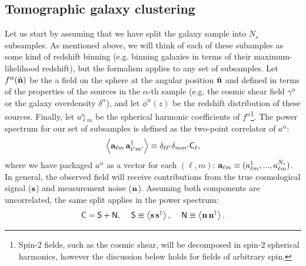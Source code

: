 \documentclass[twocolumn,amsfont,amssymb,amsmath, showpacs,balancelastpage, nofootinbib]{revtex4-1}
\newcommand{\nv}{\hat{\bf n}}
\begin{document}
  \subsection{Tomographic galaxy clustering}\label{ssec:method.tomographic}
    Let us start by assuming that we have split the galaxy sample into $N_s$ subsamples. As mentioned above, we will think of each of these subamples as some kind of redshift binning (e.g. binning galaxies in terms of their maximum-likelihood redshift), but the formalism applies to any set of subsamples. Let $f^\alpha(\nv)$ be the a field on the sphere at the angular position $\nv$ and defined in terms of the properties of the sources in the $\alpha$-th sample (e.g. the cosmic shear field $\gamma^\alpha$ or the galaxy overdensity $\delta^\alpha$), and let $\phi^\alpha(z)$ be the redshift distribution of these sources. Finally, let $a^\alpha_{\ell m}$ be the spherical harmonic coefficients of $f^\alpha$\footnote{Spin-2 fields, such as the cosmic shear, will be decomposed in spin-2 spherical harmonics, however the discussion below holds for fields of arbitrary spin.}. The power spectrum for our set of subsamples is defined as the two-point correlator of $a^\alpha$:
    \begin{equation}
      \left\langle {\bf a}_{\ell m}\,{\bf a}^\dag_{\ell' m'} \right\rangle\equiv\delta_{\ell\ell'}\delta_{mm'}{\sf C}_\ell,
    \end{equation}
    where we have packaged $a^\alpha$ as a vector for each $(\ell,m)$: ${\bf a}_{\ell m}\equiv(a^1_{\ell m},...,a^{N_s}_{\ell m})$. In general, the observed field will receive contributions from the true cosmological signal (${\bf s}$) and measurement noise (${\bf n}$). Assuming both components are uncorrelated, the same split applies in the power spectrum:
    \begin{equation}
      {\sf C}={\sf S}+{\sf N},\hspace{12pt}
      {\sf S}\equiv\left\langle{\bf s}\,{\bf s}^\dag\right\rangle, \hspace{12pt}
      {\sf N}\equiv\left\langle{\bf n}\,{\bf n}^\dag\right\rangle.
    \end{equation}
  
\end{document}
